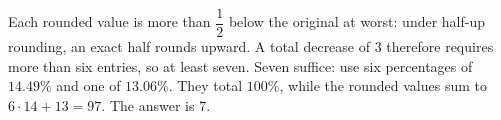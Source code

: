 Each rounded value is more than $\dfrac{1}{2}$ below the original at worst: under half-up rounding, an exact half rounds upward. A total decrease of $3$ therefore requires more than six entries, so at least seven. Seven suffice: use six percentages of $14.49\%$ and one of $13.06\%$. They total $100\%$, while the rounded values sum to $6\cdot14+13=97$. The answer is $\boxed7$.
